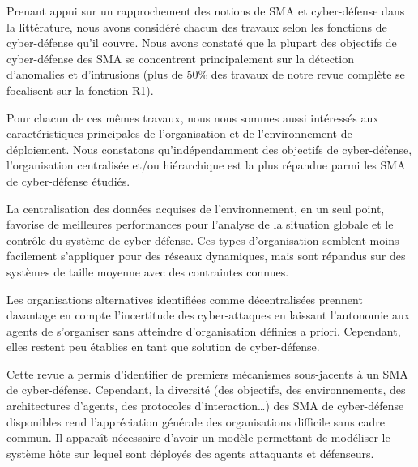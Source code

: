 Prenant appui sur un rapprochement des notions de SMA et cyber-défense dans la littérature, nous avons considéré chacun des travaux selon les fonctions de cyber-défense qu'il couvre.
Nous avons constaté que la plupart des objectifs de cyber-défense des SMA se concentrent principalement sur la détection d'anomalies et d'intrusions (plus de 50\% des travaux de notre revue complète se focalisent sur la fonction R1).

Pour chacun de ces mêmes travaux, nous nous sommes aussi intéressés aux caractéristiques principales de l’organisation et de l'environnement de déploiement.
Nous constatons qu'indépendamment des objectifs de cyber-défense, l'organisation centralisée et/ou hiérarchique est la plus répandue parmi les SMA de cyber-défense étudiés.

\noindent

La centralisation des données acquises de l'environnement, en un seul point, favorise de meilleures performances pour l'analyse de la situation globale et le contrôle du système de cyber-défense. Ces types d'organisation semblent moins facilement s'appliquer pour des réseaux dynamiques, mais sont répandus sur des systèmes de taille moyenne avec des contraintes connues\cite{vasilomanolakis2015taxonomy}.

\noindent


Les organisations alternatives identifiées comme décentralisées prennent davantage en compte l'incertitude des cyber-attaques en laissant l'autonomie aux agents de s'organiser sans atteindre d'organisation définies a priori. Cependant, elles restent peu établies en tant que solution de cyber-défense.


Cette revue a permis d'identifier de premiers mécanismes sous-jacents à un SMA de cyber-défense. Cependant, la diversité (des objectifs, des environnements, des architectures d'agents, des protocoles d'interaction\dots) des SMA de cyber-défense disponibles rend l'appréciation générale des organisations difficile sans cadre commun.
Il apparaît nécessaire d'avoir un modèle permettant de modéliser le système hôte sur lequel sont déployés des agents attaquants et défenseurs.

